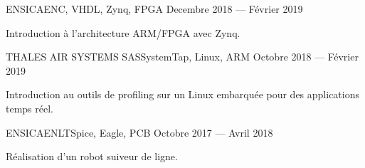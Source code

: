 \documentclass{faresume}
\begin{document}
\begin{column}[\leftcolumnwidth]
            {ENSICAEN}{C, VHDL, Zynq, FPGA}
            {Decembre 2018 --- Février 2019}
            {%
                \begin{additems}
                    \item Introduction à l'architecture ARM/FPGA avec Zynq.
                \end{additems}
            }

            {THALES AIR SYSTEMS SAS}{SystemTap, Linux, ARM}
            {Octobre 2018 --- Février 2019}
            {%
                \begin{additems}
                    \item Introduction au outils de profiling sur un Linux embarquée pour des applications temps réel.
                \end{additems}
            }

            {ENSICAEN}{LTSpice, Eagle, PCB}
            {Octobre 2017 --- Avril 2018}
            {%
                \begin{additems}
                    \item Réalisation d'un robot suiveur de ligne.
                \end{additems}
            }

\end{column}
\end{document}
